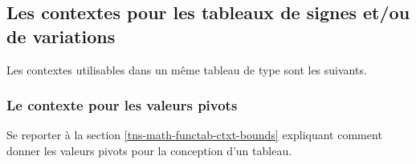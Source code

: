 \documentclass[10pt, a4paper]{article}
\begin{document}

\subsection{Les contextes pour les tableaux de signes et/ou de variations}

Les contextes utilisables dans un même tableau de type  sont les suivants.

\medskip

\begin{itemize*}[before = \leavevmode\kern15pt, itemjoin = \kern15pt]
	\item {}

	\item {}

	\item {}
\end{itemize*}




\subsubsection{Le contexte  pour les valeurs pivots}

Se reporter à la section \ref{tns-math-functab-ctxt-bounds} expliquant comment donner les valeurs pivots pour la conception d'un tableau.
\end{document}
